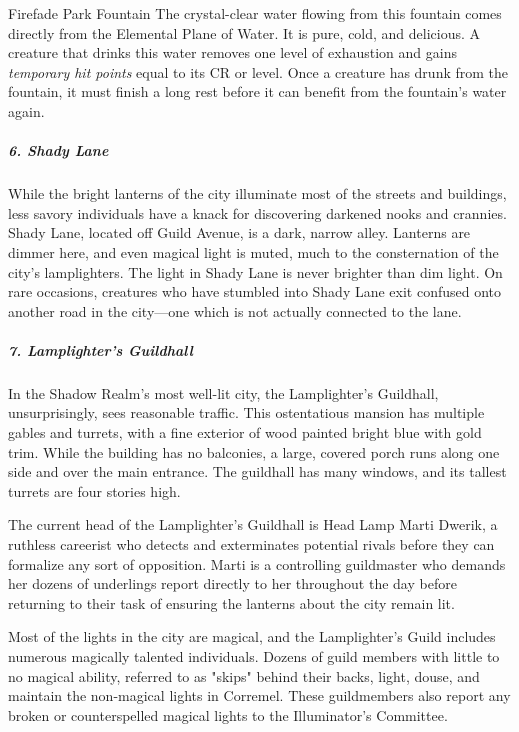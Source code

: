 \documentclass[10pt,a4paper,twoside,bg=print,twocolumn,openany,nodeprecatedcode]{dndbook}
\begin{document}
\begin{DndSidebar}[float=!b]{Firefade Park Fountain}
The crystal-clear water flowing from this fountain comes directly from the Elemental Plane of Water. It is pure, cold, and delicious. A creature that drinks this water removes one level of exhaustion and gains \textit{temporary hit points} equal to its CR or level. Once a creature has drunk from the fountain, it must finish a long rest before it can benefit from the fountain's water again.



\end{DndSidebar}

\subparagraph{6. Shady Lane}
While the bright lanterns of the city illuminate most of the streets and buildings, less savory individuals have a knack for discovering darkened nooks and crannies. Shady Lane, located off Guild Avenue, is a dark, narrow alley. Lanterns are dimmer here, and even magical light is muted, much to the consternation of the city's lamplighters. The light in Shady Lane is never brighter than dim light. On rare occasions, creatures who have stumbled into Shady Lane exit confused onto another road in the city—one which is not actually connected to the lane.

\subparagraph{7. Lamplighter's Guildhall}
In the Shadow Realm's most well-lit city, the Lamplighter's Guildhall, unsurprisingly, sees reasonable traffic. This ostentatious mansion has multiple gables and turrets, with a fine exterior of wood painted bright blue with gold trim. While the building has no balconies, a large, covered porch runs along one side and over the main entrance. The guildhall has many windows, and its tallest turrets are four stories high.

The current head of the Lamplighter's Guildhall is Head Lamp Marti Dwerik, a ruthless careerist who detects and exterminates potential rivals before they can formalize any sort of opposition. Marti is a controlling guildmaster who demands her dozens of underlings report directly to her throughout the day before returning to their task of ensuring the lanterns about the city remain lit.

Most of the lights in the city are magical, and the Lamplighter's Guild includes numerous magically talented individuals. Dozens of guild members with little to no magical ability, referred to as "skips" behind their backs, light, douse, and maintain the non-magical lights in Corremel. These guildmembers also report any broken or counterspelled magical lights to the Illuminator's Committee.
\end{document}
